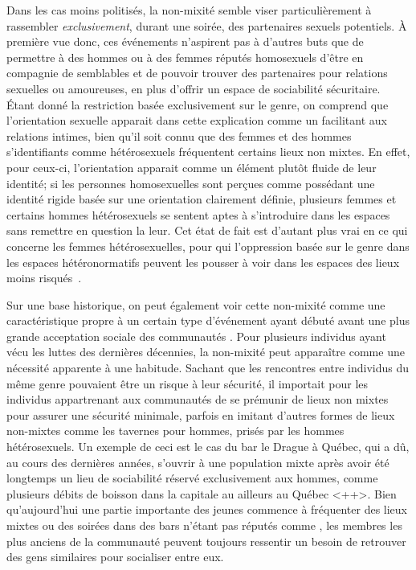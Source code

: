Dans les cas moins politisés, la non-mixité semble viser particulièrement à rassembler \emph{exclusivement}, durant une soirée, des partenaires sexuels potentiels.
À première vue donc, ces événements n'aspirent pas à d'autres buts que de permettre à des hommes ou à des femmes réputés homosexuels d'être en compagnie de semblables et de pouvoir trouver des partenaires pour relations sexuelles ou amoureuses, en plus d'offrir un espace de sociabilité sécuritaire.
Étant donné la restriction basée exclusivement sur le genre, on comprend que l'orientation sexuelle apparait dans cette explication comme un facilitant aux relations intimes, bien qu'il soit connu que des femmes et des hommes s'identifiants comme hétérosexuels fréquentent certains lieux non mixtes.
En effet, pour ceux-ci, l'orientation apparait comme un élément plutôt fluide de leur identité; si les personnes homosexuelles sont perçues comme possédant une identité rigide basée sur une orientation clairement définie, plusieurs femmes et certains hommes hétérosexuels se sentent aptes à s'introduire dans les espaces \lgbt{} sans remettre en question la leur.
Cet état de fait est d'autant plus vrai en ce qui concerne les femmes hétérosexuelles, pour qui l'oppression basée sur le genre dans les espaces hétéronormatifs peuvent les pousser à voir dans les espaces \lgbt{} des lieux moins risqués~\citep[][9]{Bettani2014}.

Sur une base historique, on peut également voir cette non-mixité comme une caractéristique propre à un certain type d'événement ayant débuté avant une plus grande acceptation sociale des communautés \lgbt{}.
Pour plusieurs individus \lgbt{} ayant vécu les luttes \lgbt{} des dernières décennies, la non-mixité peut apparaître comme une nécessité apparente à une habitude.
Sachant que les rencontres entre individus du même genre pouvaient être un risque à leur sécurité, il importait pour les individus appartrenant aux  communautés \lgbt{} de se prémunir de lieux non mixtes pour assurer une sécurité minimale, parfois en imitant d'autres formes de lieux non-mixtes comme les tavernes pour hommes, prisés par les hommes hétérosexuels.
Un exemple de ceci est le cas du bar le Drague à Québec, qui a dû, au cours des dernières années, s'ouvrir à une population mixte après avoir été longtemps un lieu de sociabilité réservé exclusivement aux hommes, comme plusieurs débits de boisson dans la capitale au ailleurs au Québec \missref{}<++>.
Bien qu'aujourd'hui une partie importante des jeunes \lgbt{} commence à fréquenter des lieux mixtes ou des soirées dans des bars n'étant pas réputés comme \lgbt{}, les membres les plus anciens de la communauté peuvent toujours ressentir un besoin de retrouver des gens similaires pour socialiser entre eux.

